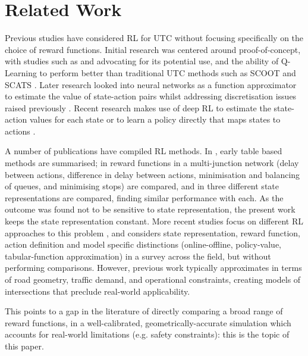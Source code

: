 \documentclass[conference]{IEEEtran}
\begin{document}
\section{Related Work} \label{lit}
Previous studies have considered RL for UTC without focusing specifically on the choice of reward functions.
Initial research was centered around proof-of-concept, with studies such as \cite{wiering2000} and \cite{abdulhai2003} advocating for its potential use, and the ability of Q-Learning to perform better \cite{abdulhai2010} \cite{prashanth2011} than traditional UTC methods such as SCOOT \cite{SCOOT} and SCATS \cite{SCATS}. 
Later research looked into neural networks as a function approximator to estimate the value of state-action pairs whilst addressing discretisation issues raised previously \cite{richter2007} \cite{araghi2013}.
Recent research makes use of deep RL to estimate the state-action values for each state \cite{mannion} \cite{vanderpol2016} \cite{genders2016} \cite{gao2017} \cite{wan2018} \cite{liang2018} \cite{zhou2019} or to learn a policy directly that maps states to actions \cite{richter2007} \cite{mousavi2017} \cite{genders2018} \cite{gendersthesis} \cite{aslani2019}.

A number of publications have compiled RL methods. In \cite{rlparam}, early table based methods are summarised; in \cite{mannion} reward functions in a multi-junction network (delay between actions, difference in delay between actions, minimisation and balancing of queues, and minimising stops) are compared, and in \cite{genders2018} three different state representations are compared, finding similar performance with each. As the outcome was found not to be sensitive to state representation, the present work keeps the state representation constant. More recent studies focus on different RL approaches to this problem \cite{yau}, and \cite{wei2019} considers state representation, reward function, action definition and model specific distinctions (online-offline, policy-value, tabular-function approximation) in a survey across the field, but without performing comparisons.
However, previous work typically approximates in terms of road geometry, traffic demand, and operational constraints, creating models of intersections that preclude real-world applicability.

This points to a gap in the literature of directly comparing a broad range of reward functions, in a well-calibrated, geometrically-accurate simulation which accounts for real-world limitations (e.g. safety constraints): this is the topic of this paper.
\end{document}

